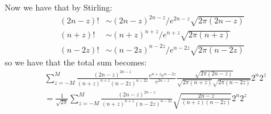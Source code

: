 \documentclass[]{article}
\theoremstyle{definition}
\numberwithin{theorem}{section}
\numberwithin{equation}{section}
\begin{document}
Now we have that by Stirling:
\begin{align*}
	(2n - z)! &\sim (2n - z)^{2n-z}/e^{2n - z} \sqrt{2 \pi (2n-z)}\\
	(n + z)! &\sim (n + z)^{n + z}/e^{n + z} \sqrt{2 \pi (n + z)}\\
	(n - 2z)! &\sim (n - 2z)^{n - 2z}/e^{n - 2z} \sqrt{2 \pi (n -2z)}
\end{align*}
so we have that the total sum becomes:
\begin{align*}
	&\sum_{z = -M}^M \frac{(2n - z)^{2n - z}}{(n + z)^{n + z} (n - 2z)^{n - 2z}} \frac{e^{n + z} e^{n - 2z}}{e^{2n - z}} \frac{\sqrt{2\pi (2n - z)}}{\sqrt{2\pi (n + z)} \sqrt{2\pi (n - 2z)}} 2^{n} 2^z \\
	&= \frac{1}{\sqrt{2\pi}}\sum_{z = -M}^M \frac{(2n - z)^{2n - z}}{(n + z)^{n + z} (n - 2z)^{n - 2z}} \sqrt{\frac{2n - z}{(n + z)(n - 2z)}} 2^{n} 2^z
\end{align*}
\end{document}
